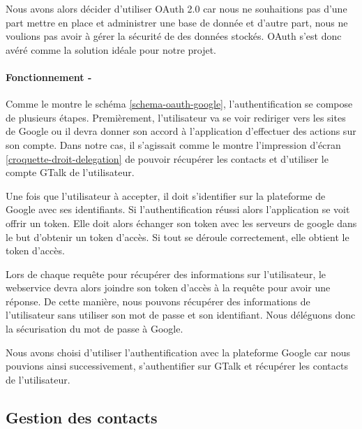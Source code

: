 Nous avons alors décider d'utiliser OAuth 2.0 car nous ne souhaitions pas d'une part mettre en place 
et administrer une base de donnée et d'autre part, nous ne voulions pas avoir à gérer la sécurité de 
des données stockés. OAuth s'est donc avéré comme la solution idéale pour notre projet.


\paragraph{Fonctionnement -}

Comme le montre le schéma \ref{schema-oauth-google}, l'authentification se compose de plusieurs étapes.
Premièrement, l'utilisateur va se voir rediriger vers les sites de Google ou il devra donner son accord
à l'application d'effectuer des actions sur son compte. Dans notre cas, il s'agissait comme le montre
l'impression d'écran \ref{croquette-droit-delegation} de pouvoir récupérer les contacts et d'utiliser 
le compte GTalk de l'utilisateur.

Une fois que l'utilisateur à accepter, il doit s'identifier sur la plateforme de Google avec ses identifiants.
Si l'authentification réussi alors l'application se voit offrir un token. Elle doit alors échanger 
son token avec les serveurs de google dans le but d'obtenir un token d'accès. Si tout se déroule correctement,
elle obtient le token d'accès.

Lors de chaque requête pour récupérer des informations sur l'utilisateur, le webservice devra alors
joindre son token d'accès à la requête pour avoir une réponse. De cette manière, nous pouvons récupérer
des informations de l'utilisateur sans utiliser son mot de passe et son identifiant. Nous déléguons donc
la sécurisation du mot de passe à Google.

Nous avons choisi d'utiliser l'authentification avec la plateforme Google car nous pouvions ainsi 
successivement, s'authentifier sur GTalk et récupérer les contacts de l'utilisateur.



\subsection{Gestion des contacts}

